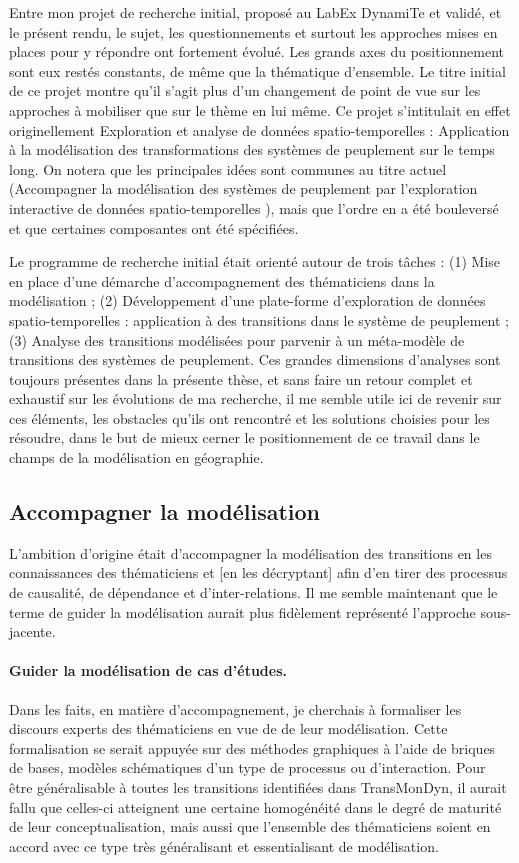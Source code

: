 Entre mon projet de recherche initial, proposé au LabEx DynamiTe et validé, et le présent rendu, le sujet, les questionnements et surtout les approches mises en places pour y répondre ont fortement évolué.
Les grands axes du positionnement sont eux restés constants, de même que la thématique d'ensemble.
Le titre initial de ce projet montre qu'il s'agit plus d'un changement de point de vue sur les approches à mobiliser que sur le thème en lui même.
Ce projet s'intitulait en effet originellement \og Exploration et analyse de données spatio-temporelles : Application à la modélisation des transformations des systèmes de peuplement sur le temps long\fg{}.
On notera que les principales idées sont communes au titre actuel (\og Accompagner la modélisation des systèmes de peuplement par l’exploration interactive de données spatio-temporelles \fg{}), mais que l'ordre en a été bouleversé et que certaines composantes ont été spécifiées.

Le programme de recherche initial était orienté autour de trois tâches : (1) Mise en place d'une démarche d'accompagnement des thématiciens dans la modélisation ; (2) Développement d'une plate-forme d'exploration de données spatio-temporelles : application à des transitions dans le système de peuplement ; (3) Analyse des transitions modélisées pour parvenir à un méta-modèle de transitions des systèmes de peuplement.
Ces grandes dimensions d'analyses sont toujours présentes dans la présente thèse, et sans faire un retour complet et exhaustif sur les évolutions de ma recherche, il me semble utile ici de revenir sur ces éléments, les obstacles qu'ils ont rencontré et les solutions choisies pour les résoudre, dans le but de mieux cerner le positionnement de ce travail dans le champs de la modélisation en géographie.


\subsection{Accompagner la modélisation}

L'ambition d'origine était d'accompagner la modélisation des transitions en \og [extrayant] les connaissances des thématiciens et [en les décryptant] afin d'en tirer des processus de causalité, de dépendance et d'inter-relations\fg{}.
Il me semble maintenant que le terme de \og guider la modélisation\fg{} aurait plus fidèlement représenté l'approche sous-jacente.

\paragraph{Guider la modélisation de cas d'études.}
Dans les faits, en matière d'accompagnement, je cherchais à formaliser les discours experts des thématiciens en vue de de leur modélisation.
Cette formalisation se serait appuyée sur des méthodes graphiques à l'aide de \og briques de bases\fg{}, modèles schématiques d'un type de processus ou d'interaction.
Pour être généralisable à toutes les transitions identifiées dans TransMonDyn, il aurait fallu que celles-ci atteignent une certaine homogénéité dans le degré de maturité de leur conceptualisation, mais aussi que l'ensemble des thématiciens soient en accord avec ce type très généralisant et essentialisant de modélisation.

